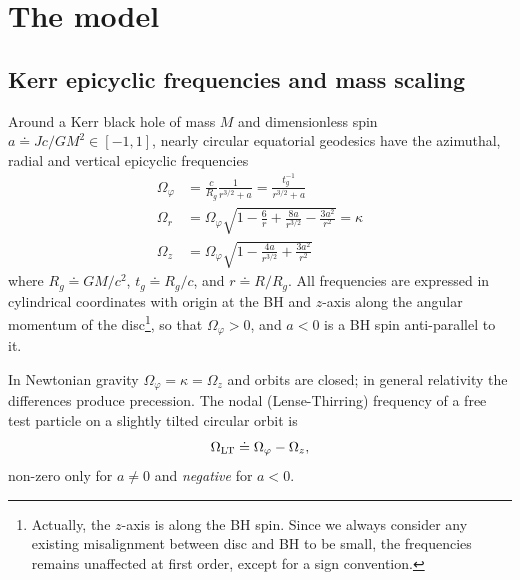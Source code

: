 \section{The model}
\label{sec:model}


\subsection{Kerr epicyclic frequencies and mass scaling}
\label{sec2:kerr}

Around a Kerr black hole of mass $M$ and dimensionless spin $a \doteq Jc/GM^2 \in [-1,1]$, nearly circular equatorial geodesics have the azimuthal, radial and vertical epicyclic frequencies
\begin{align}
    \label{eq2:epiphi}
    \Omega_\varphi &= \frac{c}{R_g} \frac{1}{r^{3/2} + a} = \frac{t_g^{-1}}{r^{3/2} + a}\\
    \label{eq2:epir}
    \Omega_r &= \Omega_\varphi \sqrt{ 1 - \frac{6}{r} + \frac{8a}{r^{3/2}} - \frac{3a^2}{r^2}} = \kappa\\
    \label{eq2:epiz}
    \Omega_z &= \Omega_\varphi \sqrt{ 1 - \frac{4a}{r^{3/2}} + \frac{3a^2}{r^2}}
\end{align}
where $R_g \doteq GM/c^2$, $t_g \doteq R_g/c$, and $r \doteq R/R_g$.
All frequencies are expressed in cylindrical coordinates with origin at the BH and $z$-axis along the angular momentum of the disc\footnote{Actually, the $z$-axis is along the BH spin. Since we always consider any existing misalignment between disc and BH to be small, the frequencies remains unaffected at first order, except for a sign  convention.}, so that $\Omega_\varphi>0$, and $a<0$ is a BH spin anti-parallel to it.

In Newtonian gravity $\Omega_\varphi=\kappa=\Omega_z$ and orbits are closed; in general relativity the differences produce precession.
The nodal (Lense-Thirring) frequency of a free test particle on a slightly tilted circular orbit is
\begin{equation}
    \label{eq2:omlt}
    \Omega_\textup{LT} \doteq \Omega_\varphi - \Omega_z ,
\end{equation}
non-zero only for $a\neq0$ and \emph{negative} for $a<0$.

